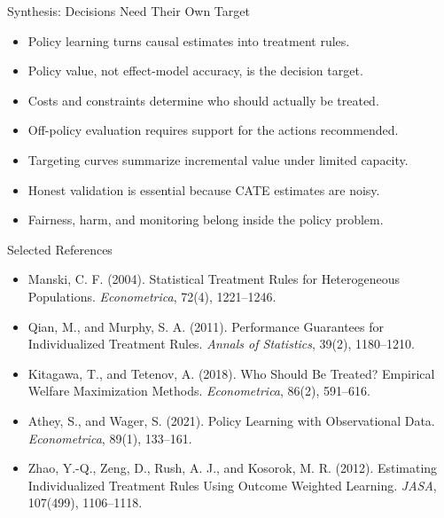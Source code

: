 \documentclass[aspectratio=169,11pt]{beamer}
\begin{document}
\begin{frame}{Synthesis: Decisions Need Their Own Target}
\begin{itemize}
\item Policy learning turns causal estimates into treatment rules.
\item Policy value, not effect-model accuracy, is the decision target.
\item Costs and constraints determine who should actually be treated.
\item Off-policy evaluation requires support for the actions recommended.
\item Targeting curves summarize incremental value under limited capacity.
\item Honest validation is essential because CATE estimates are noisy.
\item Fairness, harm, and monitoring belong inside the policy problem.
\end{itemize}
\end{frame}

\begin{frame}{Selected References}
\small
\begin{itemize}
\item Manski, C. F. (2004). Statistical Treatment Rules for Heterogeneous Populations. \textit{Econometrica}, 72(4), 1221--1246.
\item Qian, M., and Murphy, S. A. (2011). Performance Guarantees for Individualized Treatment Rules. \textit{Annals of Statistics}, 39(2), 1180--1210.
\item Kitagawa, T., and Tetenov, A. (2018). Who Should Be Treated? Empirical Welfare Maximization Methods. \textit{Econometrica}, 86(2), 591--616.
\item Athey, S., and Wager, S. (2021). Policy Learning with Observational Data. \textit{Econometrica}, 89(1), 133--161.
\item Zhao, Y.-Q., Zeng, D., Rush, A. J., and Kosorok, M. R. (2012). Estimating Individualized Treatment Rules Using Outcome Weighted Learning. \textit{JASA}, 107(499), 1106--1118.
\end{itemize}
\end{frame}

\contactslide
\end{document}
